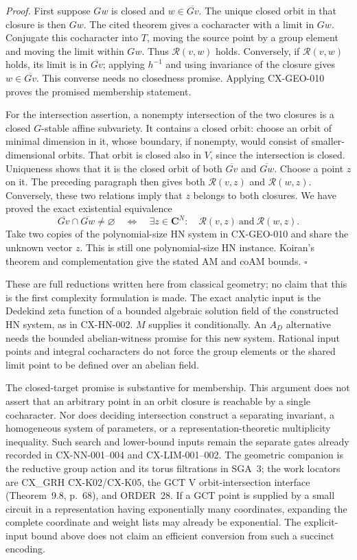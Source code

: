 \emph{Proof.} First suppose $Gw$ is closed and
$w\in\overline{Gv}$. The unique closed orbit in that closure is then
$Gw$. The cited theorem gives a cocharacter with a limit in $Gw$.
Conjugate this cocharacter into $T$, moving the source point by a group
element and moving the limit within $Gw$. Thus $\mathcal R(v,w)$
holds. Conversely, if $\mathcal R(v,w)$ holds, its limit is in
$\overline{Gv}$; applying $h^{-1}$ and using invariance of the closure
gives $w\in\overline{Gv}$. This converse needs no closedness promise.
Applying CX-GEO-010 proves the promised membership statement.

For the intersection assertion, a nonempty intersection of the two
closures is a closed $G$-stable affine subvariety. It contains a closed
orbit: choose an orbit of minimal dimension in it, whose boundary, if
nonempty, would consist of smaller-dimensional orbits. That orbit is
closed also in $V$, since the intersection is closed. Uniqueness shows
that it is the closed orbit of both $\overline{Gv}$ and
$\overline{Gw}$. Choose a point $z$ on it. The preceding paragraph
then gives both $\mathcal R(v,z)$ and $\mathcal R(w,z)$.
Conversely, these two relations imply that $z$ belongs to both closures.
We have proved the exact existential equivalence
\[
 \overline{Gv}\cap\overline{Gw}\ne\varnothing
       \quad\Longleftrightarrow\quad
       \exists z\in\mathbf C^N:\quad
                  \mathcal R(v,z)\ \text{and}\ \mathcal R(w,z).
\]
Take two copies of the polynomial-size HN system in CX-GEO-010 and share
the unknown vector $z$. This is still one polynomial-size HN instance.
Koiran's theorem and complementation give the stated AM and coAM bounds.
\hfill$\square$

These are full reductions written here from classical geometry; no claim
that this is the first complexity formulation is made. The exact analytic
input is the Dedekind zeta function of a bounded algebraic solution field
of the constructed HN system, as in CX-HN-002. $M$ supplies it
conditionally. An $A_D$ alternative needs the bounded abelian-witness
promise for this new system. Rational input points and integral
cocharacters do not force the group elements or the shared limit point
to be defined over an abelian field.

The closed-target promise is substantive for membership. This argument
does not assert that an arbitrary point in an orbit closure is reachable
by a single cocharacter. Nor does deciding intersection construct a
separating invariant, a homogeneous system of parameters, or a
representation-theoretic multiplicity inequality. Such search and
lower-bound inputs remain the separate gates already recorded in
CX-NN-001--004 and CX-LIM-001--002. The geometric companion is the
reductive group action and its torus filtrations in SGA~3; the work
locators are CX\_GRH CX-K02/CX-K05, the GCT V orbit-intersection
interface (Theorem~9.8, p.~68), and ORDER~28.
If a GCT point is supplied by a small circuit in a representation having
exponentially many coordinates, expanding the complete coordinate and
weight lists may already be exponential. The explicit-input bound above
does not claim an efficient conversion from such a succinct encoding.

